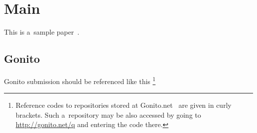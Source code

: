 
\section{Main}

This is a~sample paper~\cite{DBLP:journals/corr/cs-CL-0108005}.

\subsection{Gonito}

Gonito submission should be referenced like this
%
\footnote{Reference codes to repositories stored at
Gonito.net~\cite{gonito2016} are given in curly brackets. Such a~repository may be also accessed by going
to \url{http://gonito.net/q} and entering the code there.}

